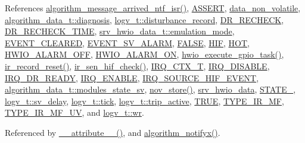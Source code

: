 References \hyperlink{a00038_source_l02104}{algorithm\+\_\+message\+\_\+arrived\+\_\+ntf\+\_\+isr()}, \hyperlink{a00072_source_l00059}{A\+S\+S\+E\+R\+T}, \hyperlink{a00060_source_l00016}{data\+\_\+non\+\_\+volatile}, \hyperlink{a00016_a16f85d57ec98b4ad05f5a2e10536b3c6}{algorithm\+\_\+data\+\_\+t\+::diagnosis}, \hyperlink{a00021_a11ed024c2cc5c53c79b2c0a8b35e3c06}{logv\+\_\+t\+::disturbance\+\_\+record}, \hyperlink{a00021_source_l00071}{D\+R\+\_\+\+R\+E\+C\+H\+E\+C\+K}, \hyperlink{a00021_source_l00075}{D\+R\+\_\+\+R\+E\+C\+H\+E\+C\+K\+\_\+\+T\+I\+M\+E}, \hyperlink{a00034_a742dceaef1f19ec73ed5acc066127476}{srv\+\_\+hwio\+\_\+data\+\_\+t\+::emulation\+\_\+mode}, \hyperlink{a00021_source_l00073}{E\+V\+E\+N\+T\+\_\+\+C\+L\+E\+A\+R\+E\+D}, \hyperlink{a00021_source_l00069}{E\+V\+E\+N\+T\+\_\+\+S\+V\+\_\+\+A\+L\+A\+R\+M}, \hyperlink{a00040_source_l00086}{F\+A\+L\+S\+E}, \hyperlink{a00017_source_l00022}{H\+I\+F}, \hyperlink{a00021_source_l00153}{H\+O\+T}, \hyperlink{a00058_source_l00043}{H\+W\+I\+O\+\_\+\+A\+L\+A\+R\+M\+\_\+\+O\+F\+F}, \hyperlink{a00058_source_l00042}{H\+W\+I\+O\+\_\+\+A\+L\+A\+R\+M\+\_\+\+O\+N}, \hyperlink{a00056_source_l00272}{hwio\+\_\+execute\+\_\+gpio\+\_\+task()}, \hyperlink{a00045_source_l01152}{ir\+\_\+record\+\_\+reset()}, \hyperlink{a00045_source_l01100}{ir\+\_\+sen\+\_\+hif\+\_\+check()}, \hyperlink{a00033_source_l00017}{I\+R\+Q\+\_\+\+C\+T\+X\+\_\+\+T}, \hyperlink{a00033_source_l00020}{I\+R\+Q\+\_\+\+D\+I\+S\+A\+B\+L\+E}, \hyperlink{a00021_source_l00064}{I\+R\+Q\+\_\+\+D\+R\+\_\+\+R\+E\+A\+D\+Y}, \hyperlink{a00033_source_l00025}{I\+R\+Q\+\_\+\+E\+N\+A\+B\+L\+E}, \hyperlink{a00021_source_l00063}{I\+R\+Q\+\_\+\+S\+O\+U\+R\+C\+E\+\_\+\+H\+I\+F\+\_\+\+E\+V\+E\+N\+T}, \hyperlink{a00016_a293140e240bbd54f7601adbc9194148c}{algorithm\+\_\+data\+\_\+t\+::modules\+\_\+state\+\_\+sv}, \hyperlink{a00060_source_l00397}{nov\+\_\+store()}, \hyperlink{a00056_source_l00013}{srv\+\_\+hwio\+\_\+data}, \hyperlink{a00021_source_l00149}{S\+T\+A\+T\+E\+\_}, \hyperlink{a00021_a854b8f967c206a5f3e4aeaf91a782b3e}{logv\+\_\+t\+::sv\+\_\+delay}, \hyperlink{a00021_source_l00247}{logv\+\_\+t\+::tick}, \hyperlink{a00021_source_l00248}{logv\+\_\+t\+::trip\+\_\+active}, \hyperlink{a00040_source_l00084}{T\+R\+U\+E}, \hyperlink{a00016_source_l00032}{T\+Y\+P\+E\+\_\+\+I\+R\+\_\+\+M\+F}, \hyperlink{a00016_source_l00033}{T\+Y\+P\+E\+\_\+\+I\+R\+\_\+\+M\+F\+\_\+\+U\+V}, and \hyperlink{a00021_source_l00249}{logv\+\_\+t\+::wr}.



Referenced by \hyperlink{a00041_source_l00025}{\+\_\+\+\_\+attribute\+\_\+\+\_\+()}, and \hyperlink{a00038_source_l02006}{algorithm\+\_\+notifyx()}.


